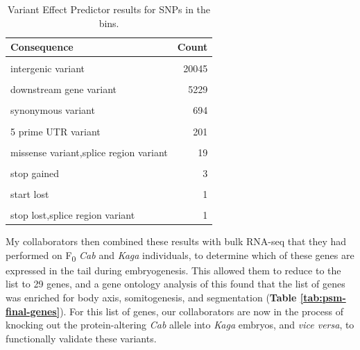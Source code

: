 \documentclass[
]{book}
\begin{document}
\begin{table}

\caption{\label{tab:int-consequence-tbl}Variant Effect Predictor results for SNPs in the bins.}
\centering
\begin{tabular}[t]{lr}
\toprule
Consequence & Count\\
\midrule
\cellcolor{gray!6}{intron variant} & \cellcolor{gray!6}{47211}\\
intergenic variant & 20045\\
\cellcolor{gray!6}{upstream gene variant} & \cellcolor{gray!6}{7304}\\
downstream gene variant & 5229\\
\cellcolor{gray!6}{3 prime UTR variant} & \cellcolor{gray!6}{1082}\\
\addlinespace
synonymous variant & 694\\
\cellcolor{gray!6}{missense variant} & \cellcolor{gray!6}{383}\\
5 prime UTR variant & 201\\
\cellcolor{gray!6}{splice region variant,intron variant} & \cellcolor{gray!6}{126}\\
missense variant,splice region variant & 19\\
\addlinespace
\cellcolor{gray!6}{splice region variant,synonymous variant} & \cellcolor{gray!6}{17}\\
stop gained & 3\\
\cellcolor{gray!6}{splice donor variant} & \cellcolor{gray!6}{1}\\
start lost & 1\\
\cellcolor{gray!6}{stop lost} & \cellcolor{gray!6}{1}\\
\addlinespace
stop lost,splice region variant & 1\\
\bottomrule
\end{tabular}
\end{table}

My collaborators then combined these results with bulk RNA-seq that they had performed on F\textsubscript{0} \emph{Cab} and \emph{Kaga} individuals, to determine which of these genes are expressed in the tail during embryogenesis. This allowed them to reduce to the list to 29 genes, and a gene ontology analysis of this found that the list of genes was enriched for body axis, somitogenesis, and segmentation (\textbf{Table \ref{tab:psm-final-genes}}). For this list of genes, our collaborators are now in the process of knocking out the protein-altering \emph{Cab} allele into \emph{Kaga} embryos, and \emph{vice versa}, to functionally validate these variants.
\end{document}
